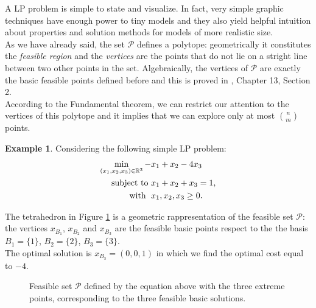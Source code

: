 \documentclass[a4paper,10 pt,titlepage,twoside]{book}
\theoremstyle{plain}
\theoremstyle{definition}
\newtheorem{ex}[thm]{Example}
\theoremstyle{remark}
\begin{document}
A LP problem is simple to state and visualize. In fact, very simple graphic techniques have enough power to tiny models and they also yield helpful intuition about properties and solution methods for models of more realistic size.\\ As we have already said, the set $\mathcal{P}$ defines a polytope: geometrically it constitutes the \textit{feasible region} and the \textit{vertices} are the points that do not lie on a stright line between two other points in the set. Algebraically, the vertices of $\mathcal{P}$ are exactly the basic feasible points defined before and this is proved in \cite{W}, Chapter 13, Section 2.\\ According to the Fundamental theorem, we can restrict our attention to the vertices of this polytope and it implies that we can explore only at most  ${n}\choose{m}$ points.
\begin{ex}\label{LPexample}
Considering the following simple LP problem:
\begin{align*}
\min\limits_{(x_{1},x_{2},x_{3})\in\mathbb{R}^{3}} -&x_{1}+ x_{2}-4x_{3}\\
\text{subject to    }&x_{1}+x_{2}+x_{3}=1,\\
 \text{\; with   \;} &x_{1}, x_{2}, x_{3} \geq 0.
\end{align*}
\end{ex}
The tetrahedron in Figure \ref{tetra} is a geometric rappresentation of the feasible set $\mathcal{P}$: the vertices ${x}_{B_{1}}$, ${x}_{B_{2}}$ and ${x}_{B_{3}}$ are the feasible basic points respect to the the basis $B_{1} =\{1\}$,  $B_{2} =\{2\}$,  $B_{3} =\{3\}$.\\ The optimal solution is ${x}_{B_{3}}=(0,0,1)$ in which we find the optimal cost equal to $-4$.\\
\begin{figure}[h]\caption{\label{tetra}Feasible set $\mathcal{P}$ defined by the equation above with the three extreme points, corresponding to the three feasible basic solutions.} 
\begin{center}
\end{center}
\end{figure}
\end{document}
